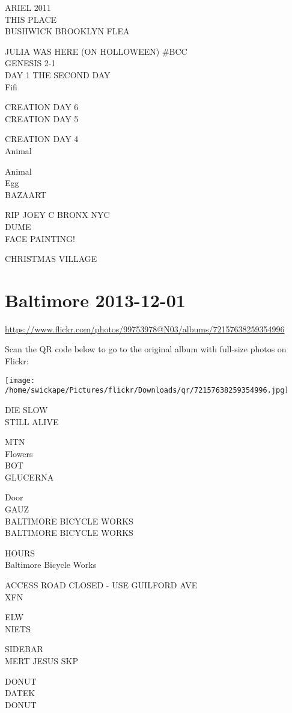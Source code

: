 \documentclass[10pt,letterpaper]{article}
\begin{document}
ARIEL 2011\\
THIS PLACE\\
BUSHWICK BROOKLYN FLEA

JULIA WAS HERE (ON HOLLOWEEN) \#BCC\\
GENESIS 2{-}1\\
DAY 1 THE SECOND DAY\\
Fifi

CREATION DAY 6\\
CREATION DAY 5

CREATION DAY 4\\
Animal

Animal\\
Egg\\
BAZAART

RIP JOEY C BRONX NYC\\
DUME\\
FACE PAINTING!

CHRISTMAS VILLAGE


\section*{Baltimore 2013-12-01}

\url{https://www.flickr.com/photos/99753978@N03/albums/72157638259354996}

Scan the QR code below to go to the original album with full-size photos on Flickr:

\texttt{[image: /home/swickape/Pictures/flickr/Downloads/qr/72157638259354996.jpg]}


DIE SLOW\\
STILL ALIVE

MTN\\
Flowers\\
BOT\\
GLUCERNA

Door\\
GAUZ\\
BALTIMORE BICYCLE WORKS\\
BALTIMORE BICYCLE WORKS

HOURS\\
Baltimore Bicycle Works

ACCESS ROAD CLOSED {-} USE GUILFORD AVE\\
XFN

ELW\\
NIETS

SIDEBAR\\
MERT JESUS SKP

DONUT\\
DATEK\\
DONUT
\end{document}
